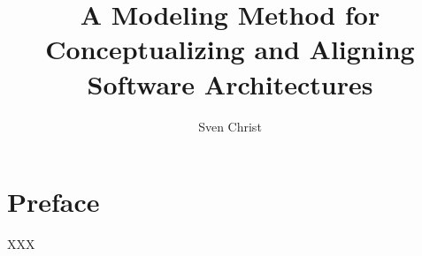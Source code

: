 \documentclass[
  draft=false,
  paper=a4,
  fontsize=12pt,
  pagesize=auto,
  twoside=false,
  headings=small,openany,
  chapterprefix=false,
  version=last,
  titlepage=true,
  parskip=half+,
  mpinclude=false,
  headsepline=true,
  toc=bibliography,
  toc=index,
  numbers=noendperiod
]{scrbook}
\begin{document}
\title{A Modeling Method for \\ Conceptualizing and Aligning \\ Software Architectures}
\subtitle{}
\author{Sven Christ}
\date{}

\maketitle

\pagestyle{empty}

\chapter*{Preface}
\thispagestyle{empty}

XXX

\tableofcontents

\newpage

\setcounter{page}{1}
\pagestyle{plain}






\printbibliography
\end{document}
